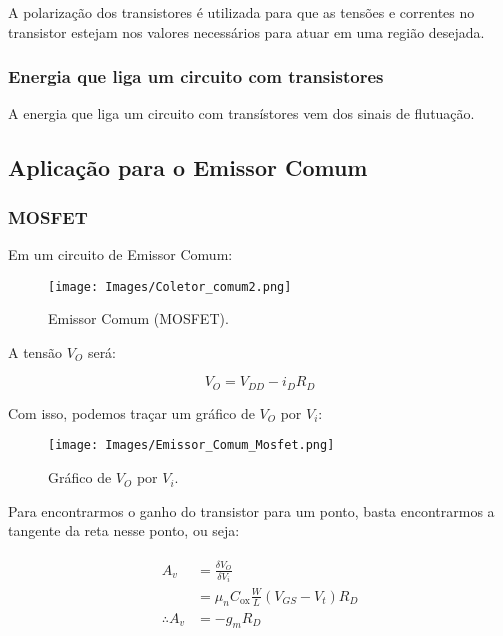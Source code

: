 \documentclass[12pt]{article}
\begin{document}
A polarização dos transistores é utilizada para que as tensões e correntes no transistor estejam nos valores necessários para atuar em uma região desejada.

\subsubsection{Energia que liga um circuito com transistores}

A energia que liga um circuito com transístores vem dos sinais de flutuação.

\subsection{Aplicação para o Emissor Comum}

\subsubsection{MOSFET}

Em um circuito de Emissor Comum:

\begin{figure}[H]
  \begin{center}
    \texttt{[image: Images/Coletor\_comum2.png]}
  \end{center}
  \caption{Emissor Comum (MOSFET).}
\end{figure}

A tensão $V_O$ será:

$$
  V_O = V_{DD} - i_D R_D
$$

Com isso, podemos traçar um gráfico de $V_O$ por $V_i$:


\begin{figure}[H]
  \begin{center}
    \texttt{[image: Images/Emissor\_Comum\_Mosfet.png]}
  \end{center}
  \caption{Gráfico de $V_O$ por $V_i$.}
\end{figure}

Para encontrarmos o ganho do transistor para um ponto, basta encontrarmos a tangente da reta nesse ponto, ou seja:

\begin{align}
  \begin{split}
    A_v &= \frac{\delta V_O}{\delta V_i} \\
        &= \mu_n C_{\text{ox}} \frac{W}{L} (V_{GS} - V_t) R_D \\[0.4cm]
    \therefore A_v &= -g_m R_D
  \end{split} 
  \label{eq:ganho1_mosfet}
\end{align}
\end{document}
